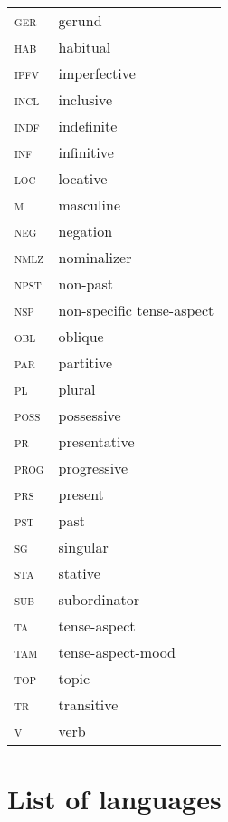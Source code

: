 ﻿\documentclass[output=paper]{langsci/langscibook}
\begin{document}
\begin{tabularx}{.45\textwidth}{ l Q }
\textsc{ger}		&gerund\\
\textsc{hab}		&habitual\\
\textsc{ipfv}		&imperfective\\
\textsc{incl}  &inclusive\\
\textsc{indf}	    &indefinite\\
\textsc{inf}        &infinitive\\
\textsc{loc}		&locative\\
\textsc{m} 		&masculine\\
\textsc{neg}		&negation\\
\textsc{nmlz}       &nominalizer\\
\textsc{npst}       &non-past\\
\textsc{nsp}        &non-specific tense-aspect\\
\textsc{obl}		&oblique\\
\textsc{par}		&partitive\\
\textsc{pl}		&plural\\
\textsc{poss}		&possessive\\
\textsc{pr}		&presentative\\
\textsc{prog}		&progressive\\
\textsc{prs}		&present\\
\textsc{pst}	&past\\
\textsc{sg}		&singular\\
\textsc{sta}		&stative\\
\textsc{sub}		&subordinator\\
\textsc{ta}		&tense-aspect\\
\textsc{tam}		&tense-aspect-mood\\
\textsc{top}		&topic\\
\textsc{tr}         &transitive\\
\textsc{v}          &verb\\
\end{tabularx}

\section*{List of languages}
\end{document}
